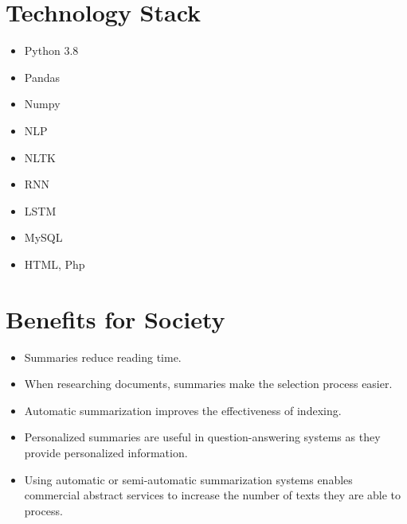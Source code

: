 \section{Technology Stack}
\begin{itemize}
\item Python 3.8
\item Pandas
\item Numpy
\item NLP
\item NLTK
\item RNN
\item LSTM
\item MySQL
\item HTML, Php

\end{itemize}

\section{Benefits for Society}

\begin{itemize}
\item Summaries reduce reading time.
\item When researching documents, summaries make the selection process easier.
\item Automatic summarization improves the effectiveness of indexing.
\item Personalized summaries are useful in question-answering systems as they provide personalized information.
\item Using automatic or semi-automatic summarization systems enables commercial abstract services to increase the number of texts they are able to process.

\end{itemize}